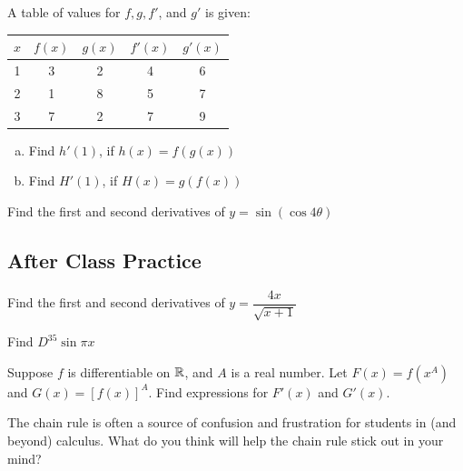 \documentclass[notes]{subfiles}
\begin{document}
		\begin{ex}
			A table of values for \(f,g,f'\), and \(g'\) is given:
			\begin{center}
				\begin{tabular}{|c|c|c|c|c|}\hline
					\(x\)	& \(f(x)\)	& \(g(x)\)	& \(f'(x)\)	& \(g'(x)\) \\ \hline
					1 & 3 & 2 & 4 & 6\\
					2 & 1 & 8 & 5 & 7\\
					3 & 7 & 2 & 7 & 9\\ \hline
				\end{tabular}
			\end{center}
			\begin{enumerate}[(a)]
				\item Find \(h'(1)\), if \(h(x) = f(g(x))\)
					
				\item Find \(H'(1)\), if \(H(x) = g(f(x))\)
			\end{enumerate}
		\end{ex}
		
		\begin{ex}
			Find the first and second derivatives of \(y = \sin (\cos 4\theta)\)
		\end{ex}
			\vs{2}
			\newpage
			
	\subsection*{After Class Practice}
		\begin{ex}
			Find the first and second derivatives of \(y = \dfrac{4x}{\sqrt{x+1}}\)
		\end{ex}
			\vs{1}
		\begin{ex}
			Find \(D^{35} \sin \pi x\)
		\end{ex}
		
		\begin{ex}
			Suppose \(f\) is differentiable on \(\mathbb{R}\), and \(A\) is a real number.  Let \(F(x) = f(x^A)\) and \(G(x) = [f(x)]^A\).  Find expressions for \(F'(x)\) and \(G'(x)\).
		\end{ex}
			
		\begin{ex}
			The chain rule is often a source of confusion and frustration for students in (and beyond) calculus.  What do you think will help the chain rule stick out in your mind?
		\end{ex}

\clearpage
\end{document}

